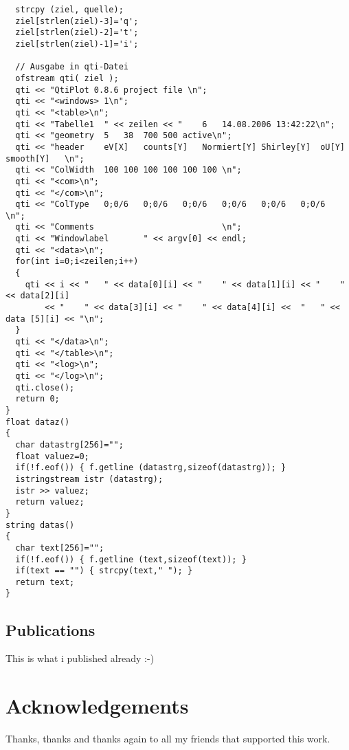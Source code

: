 \documentclass[12pt,oneside,english]{book}
\begin{document}
\begin{verbatim}
  strcpy (ziel, quelle);
  ziel[strlen(ziel)-3]='q';
  ziel[strlen(ziel)-2]='t';
  ziel[strlen(ziel)-1]='i';

  // Ausgabe in qti-Datei
  ofstream qti( ziel );
  qti << "QtiPlot 0.8.6 project file \n";
  qti << "<windows>	1\n";
  qti << "<table>\n";
  qti << "Tabelle1	" << zeilen << "	6	14.08.2006 13:42:22\n";
  qti << "geometry	5	38	700	500	active\n";
  qti << "header	eV[X]	counts[Y]	Normiert[Y]	Shirley[Y]	oU[Y]	smooth[Y]	\n";
  qti << "ColWidth	100	100	100	100	100	100	\n";
  qti << "<com>\n";
  qti << "</com>\n";
  qti << "ColType	0;0/6	0;0/6	0;0/6	0;0/6	0;0/6	0;0/6	\n";
  qti << "Comments							\n";
  qti << "Windowlabel		" << argv[0] << endl;
  qti << "<data>\n";
  for(int i=0;i<zeilen;i++)
  {
    qti << i << "	" << data[0][i] << "	" << data[1][i] << "	" << data[2][i]
        << "	" << data[3][i] << "	" << data[4][i] <<  "	" << data [5][i] << "\n";
  }
  qti << "</data>\n";
  qti << "</table>\n";
  qti << "<log>\n";
  qti << "</log>\n";
  qti.close();
  return 0;
}
float dataz()
{
  char datastrg[256]="";
  float valuez=0;
  if(!f.eof()) { f.getline (datastrg,sizeof(datastrg)); }
  istringstream istr (datastrg);
  istr >> valuez;
  return valuez;
}
string datas()
{
  char text[256]="";
  if(!f.eof()) { f.getline (text,sizeof(text)); }
  if(text == "") { strcpy(text," "); }
  return text;
}
\end{verbatim}
\normalsize

\section{Publications}

This is what i published already :-)



\chapter*{Acknowledgements}

Thanks, thanks and thanks again to all my friends that supported this work.
\end{document}
